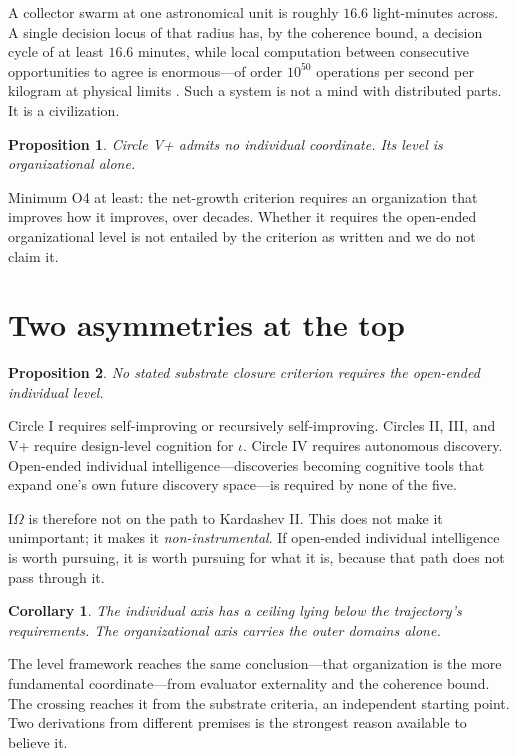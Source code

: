 \documentclass[11pt]{article}
\newtheorem{proposition}{Proposition}
\newtheorem{corollary}{Corollary}
\newcommand{\IOm}{\ensuremath{\mathrm{I}\Omega}}
\begin{document}
A collector swarm at one astronomical unit is roughly $16.6$ light-minutes across. A single decision locus of that radius has, by the coherence bound, a decision cycle of at least $16.6$ minutes, while local computation between consecutive opportunities to agree is enormous---of order $10^{50}$ operations per second per kilogram at physical limits \citep{lloyd2000ultimate}. Such a system is not a mind with distributed parts. It is a civilization.

\begin{proposition}\label{prop:nostellar}
Circle V+ admits no individual coordinate. Its level is organizational alone.
\end{proposition}

Minimum O4 at least: the net-growth criterion requires an organization that improves how it improves, over decades. Whether it requires the open-ended organizational level is not entailed by the criterion as written and we do not claim it.

\section{Two asymmetries at the top}\label{sec:asym}

\begin{proposition}\label{prop:noiomega}
No stated substrate closure criterion requires the open-ended individual level.
\end{proposition}

Circle I requires self-improving or recursively self-improving. Circles II, III, and V+ require design-level cognition for $\iota$. Circle IV requires autonomous discovery. Open-ended individual intelligence---discoveries becoming cognitive tools that expand one's own future discovery space---is required by none of the five.

\IOm{} is therefore not on the path to Kardashev II. This does not make it unimportant; it makes it \emph{non-instrumental}. If open-ended individual intelligence is worth pursuing, it is worth pursuing for what it is, because that path does not pass through it.

\begin{corollary}\label{cor:orgcarries}
The individual axis has a ceiling lying below the trajectory's requirements. The organizational axis carries the outer domains alone.
\end{corollary}

The level framework reaches the same conclusion---that organization is the more fundamental coordinate---from evaluator externality and the coherence bound. The crossing reaches it from the substrate criteria, an independent starting point. Two derivations from different premises is the strongest reason available to believe it.
\end{document}
